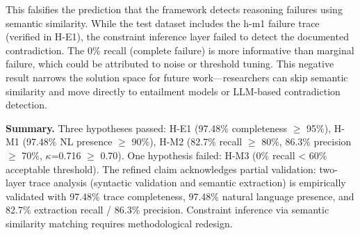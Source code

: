 This falsifies the prediction that the framework detects reasoning failures using semantic similarity. While the test dataset includes the h-m1 failure trace (verified in H-E1), the constraint inference layer failed to detect the documented contradiction. The 0\% recall (complete failure) is more informative than marginal failure, which could be attributed to noise or threshold tuning. This negative result narrows the solution space for future work---researchers can skip semantic similarity and move directly to entailment models or LLM-based contradiction detection.

\textbf{Summary.} Three hypotheses passed: H-E1 (97.48\% completeness $\geq$ 95\%), H-M1 (97.48\% NL presence $\geq$ 90\%), H-M2 (82.7\% recall $\geq$ 80\%, 86.3\% precision $\geq$ 70\%, $\kappa$=0.716 $\geq$ 0.70). One hypothesis failed: H-M3 (0\% recall < 60\% acceptable threshold). The refined claim acknowledges partial validation: two-layer trace analysis (syntactic validation and semantic extraction) is empirically validated with 97.48\% trace completeness, 97.48\% natural language presence, and 82.7\% extraction recall / 86.3\% precision. Constraint inference via semantic similarity matching requires methodological redesign.
